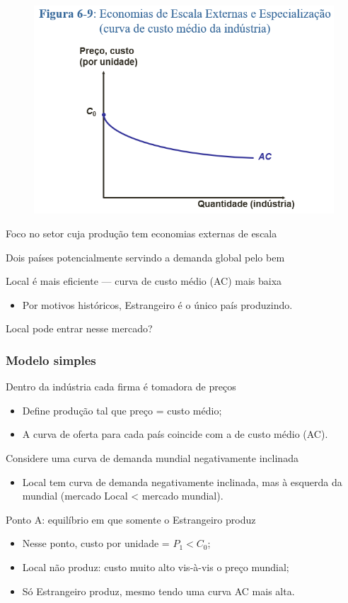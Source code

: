 \documentclass[a4paper,12pt]{article}[abntex2]
\begin{document}
\begin{figure}[H]
    \centering
    \includegraphics[width=0.7\linewidth]{Imagens/a18i2.png}
\end{figure}

Foco no setor cuja produção tem economias externas de escala

Dois países potencialmente servindo a demanda global pelo bem

Local é mais eficiente — curva de custo médio (AC) mais baixa
\begin{itemize}
    \item Por motivos históricos, Estrangeiro é o único país produzindo.
\end{itemize}

Local pode entrar nesse mercado?

\subsubsection{\textbf{Modelo simples}}
Dentro da indústria cada firma é tomadora de preços
\begin{itemize}
    \item Define produção tal que preço = custo médio;
    \item A curva de oferta para cada país coincide com a de custo médio (AC).
\end{itemize}

Considere uma curva de demanda mundial negativamente inclinada
\begin{itemize}
    \item Local tem curva de demanda negativamente inclinada, mas à esquerda da mundial (mercado Local < mercado mundial).
\end{itemize}

Ponto A: equilíbrio em que somente o Estrangeiro produz
\begin{itemize}
    \item Nesse ponto, custo por unidade = \( P_1 < C_0 \);
    \item Local não produz: custo muito alto vis-à-vis o preço mundial;
    \item Só Estrangeiro produz, mesmo tendo uma curva AC mais alta.
\end{itemize}
\end{document}
